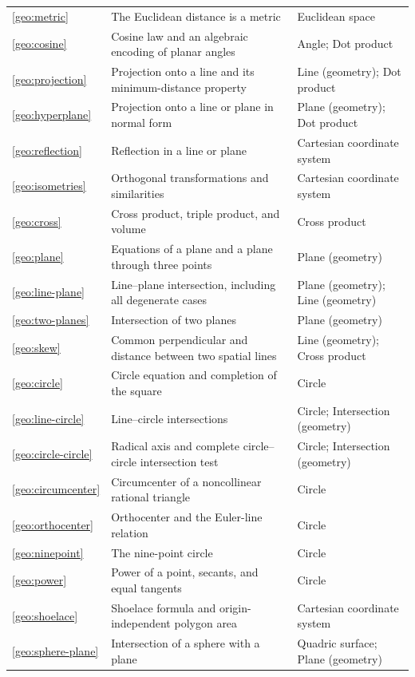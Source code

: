 \begin{longtable}{p{.08\linewidth}p{.55\linewidth}p{.28\linewidth}}
\ref{geo:metric} & The Euclidean distance is a metric & Euclidean space \\
\ref{geo:cosine} & Cosine law and an algebraic encoding of planar angles & Angle; Dot product \\
\ref{geo:projection} & Projection onto a line and its minimum-distance property & Line (geometry); Dot product \\
\ref{geo:hyperplane} & Projection onto a line or plane in normal form & Plane (geometry); Dot product \\
\ref{geo:reflection} & Reflection in a line or plane & Cartesian coordinate system \\
\ref{geo:isometries} & Orthogonal transformations and similarities & Cartesian coordinate system \\
\ref{geo:cross} & Cross product, triple product, and volume & Cross product \\
\ref{geo:plane} & Equations of a plane and a plane through three points & Plane (geometry) \\
\ref{geo:line-plane} & Line--plane intersection, including all degenerate cases & Plane (geometry); Line (geometry) \\
\ref{geo:two-planes} & Intersection of two planes & Plane (geometry) \\
\ref{geo:skew} & Common perpendicular and distance between two spatial lines & Line (geometry); Cross product \\
\ref{geo:circle} & Circle equation and completion of the square & Circle \\
\ref{geo:line-circle} & Line--circle intersections & Circle; Intersection (geometry) \\
\ref{geo:circle-circle} & Radical axis and complete circle--circle intersection test & Circle; Intersection (geometry) \\
\ref{geo:circumcenter} & Circumcenter of a noncollinear rational triangle & Circle \\
\ref{geo:orthocenter} & Orthocenter and the Euler-line relation & Circle \\
\ref{geo:ninepoint} & The nine-point circle & Circle \\
\ref{geo:power} & Power of a point, secants, and equal tangents & Circle \\
\ref{geo:shoelace} & Shoelace formula and origin-independent polygon area & Cartesian coordinate system \\
\ref{geo:sphere-plane} & Intersection of a sphere with a plane & Quadric surface; Plane (geometry) \\

\end{longtable}
